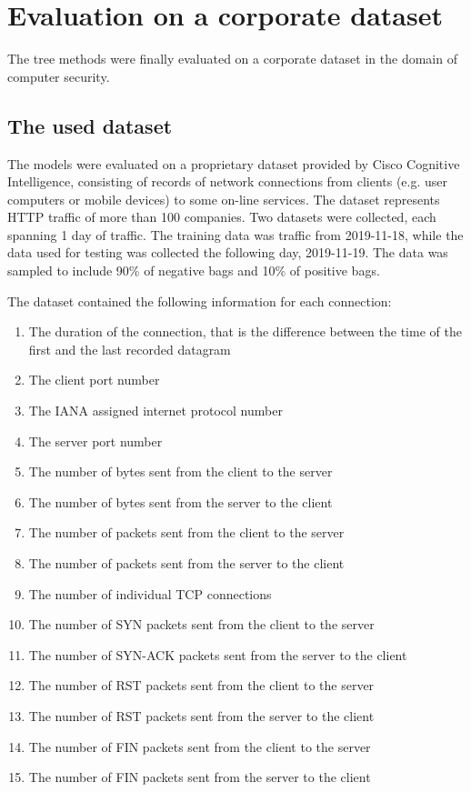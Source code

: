 \chapter{Evaluation on a corporate dataset}\label{chap:cisco-dataset}

The tree methods were finally evaluated on a corporate dataset in the domain of computer security.

\section{The used dataset}

The models were evaluated on a proprietary dataset provided by Cisco Cognitive Intelligence, consisting of records of network connections from clients (e.g. user computers or mobile devices) to some on-line services. The dataset represents HTTP traffic of more than 100 companies. Two datasets were collected, each spanning 1 day of traffic. The training data was traffic from 2019-11-18, while the data used for testing was collected the following day, 2019-11-19. The data was sampled to include 90\% of negative bags and 10\% of positive bags.

The dataset contained the following information for each connection:
\begin{enumerate}
  \item The duration of the connection, that is the difference between the time of the first and the last recorded datagram
  \item The client port number
  \item The IANA assigned internet protocol number
  \item The server port number
  \item The number of bytes sent from the client to the server
  \item The number of bytes sent from the server to the client
  \item The number of packets sent from the client to the server
  \item The number of packets sent from the server to the client
  \item The number of individual TCP connections
  \item The number of SYN packets sent from the client to the server
  \item The number of SYN-ACK packets sent from the server to the client
  \item The number of RST packets sent from the client to the server
  \item The number of RST packets sent from the server to the client
  \item The number of FIN packets sent from the client to the server
  \item The number of FIN packets sent from the server to the client
\end{enumerate}

